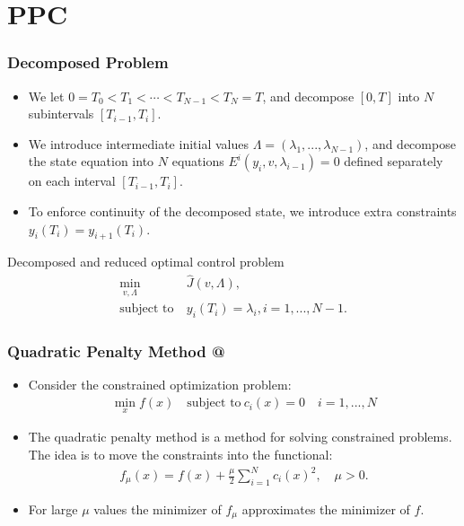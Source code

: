 \documentclass[9pt]{beamer}
\makeatletter
\newcommand*{\rom}[1]{\expandafter\@slowromancap\romannumeral #1@}
\makeatother
\begin{document}
\section{PPC}
\begin{frame}
\frametitle{Decomposed Problem}
\begin{itemize}
\item{We let $0=T_0<T_1<\cdots<T_{N-1}<T_N=T$, and decompose $[0,T]$ into $N$ subintervals $[T_{i-1},T_i]$. }
\item{We introduce intermediate initial values $\Lambda=(\lambda_1,...,\lambda_{N-1})$, and decompose the state equation into $N$ equations $E^i(y_i,v,\lambda_{i-1})=0$ defined separately on each interval $[T_{i-1},T_i]$.}
\item{To enforce continuity of the decomposed state, we introduce extra constraints $y_i(T_i)=y_{i+1}(T_i)$.}
\end{itemize}
\begin{block}{Decomposed and reduced optimal control problem}
\begin{align*}
\min_{v,\Lambda} &\hat J(v,\Lambda), \\
\textrm{subject to} \ &y_i(T_i)=\lambda_i,i=1,...,N-1. 
\end{align*}
\end{block}
\end{frame}
\begin{frame}
\frametitle{Quadratic Penalty Method \rom{1}}
\begin{itemize}
\item{Consider the constrained optimization problem:
\begin{align*}
\min_x f(x) \quad \textrm{subject to} \ c_i(x)=0 \quad i=1,...,N
\end{align*}}
\item{The quadratic penalty method is a method for solving constrained problems. The idea is to move the constraints into the functional:
\begin{align*}
f_{\mu}(x) = f(x) + \frac{\mu }{2}\sum_{i=1}^N c_i(x)^2, \quad \mu>0.
\end{align*}}
\item{For large $\mu$ values the minimizer of $f_{\mu}$ approximates the minimizer of $f$.}
\end{itemize}
\end{frame}
\end{document}
